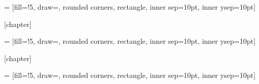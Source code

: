  = [fill=\propcolorfill!5,
                         draw=\propcolorborder,
                         rounded corners,
    rectangle, inner sep=10pt, inner ysep=10pt]

\newcommand{\prop}[2][]
{\stepcounter{propcounter}
 \setlength{\netlength}{\textwidth}
 \addtolength{\netlength}{-20pt}
 
 \medskip\noindent
 \begin{tikzpicture}
   \node[pboxstyle] (dbox)
   {\begin{minipage}{\netlength}
    \ifthenelse{\equal{#1}{\empty}}{\smallskip}{\medskip}
    #2
    \end{minipage}
    };
   \node at (dbox.north west) [xshift=2mm, anchor=west, fill=white, text=\propcolorborder, top color=white, bottom color=\propcolorfill!5, rounded corners]
   {\textbf{\large Propriété \arabic{propcounter}}
    \ifthenelse{\equal{#1}{\empty}}{}{{\large(#1)}}
    };
 \end{tikzpicture}
 }


[chapter]

 = [fill=\exemplecolorfill!5,
draw=\exemplecolorborder,
rounded corners,
rectangle, inner sep=10pt, inner ysep=10pt]

\newcommand{\exemple}[2][]
{\stepcounter{exemplecounter}
	\setlength{\netlength}{\textwidth}
	\addtolength{\netlength}{-20pt}
	
	\medskip\noindent
	\begin{tikzpicture}
	\node[eboxstyle] (dbox)
	{\begin{minipage}{\netlength}
		\ifthenelse{\equal{#1}{\empty}}{\smallskip}{\medskip}
		#2
		\end{minipage}
	};
	\node at (dbox.north west) [xshift=2mm, anchor=west, fill=white, text=\exemplecolorborder, top color=white, bottom color=\exemplecolorfill!5, rounded corners]
	{\textbf{\large Exemple}
		\ifthenelse{\equal{#1}{\empty}}{}{{\large(#1)}}
	};
	\end{tikzpicture}
}

[chapter]

 = [fill=\activitycolorfill!5,
draw=\activitycolorborder,
rounded corners,
rectangle, inner sep=10pt, inner ysep=10pt]

